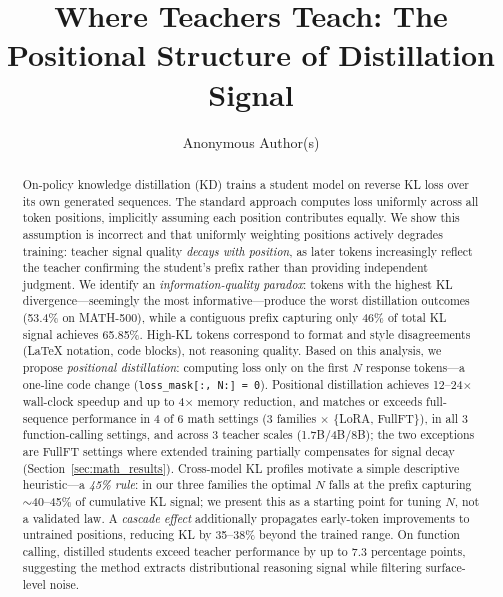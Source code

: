 \documentclass[10pt]{article}
\title{Where Teachers Teach: The Positional Structure of Distillation Signal}
\author{
  Anonymous Author(s)
}
\begin{document}
\maketitle

\begin{abstract}
On-policy knowledge distillation (KD) trains a student model on reverse KL loss over its own generated sequences.
The standard approach computes loss uniformly across all token positions, implicitly assuming each position contributes equally.
We show this assumption is incorrect and that uniformly weighting positions actively degrades training: teacher signal quality \emph{decays with position}, as later tokens increasingly reflect the teacher confirming the student's prefix rather than providing independent judgment.
We identify an \emph{information-quality paradox}: tokens with the highest KL divergence---seemingly the most informative---produce the worst distillation outcomes (53.4\% on MATH-500), while a contiguous prefix capturing only 46\% of total KL signal achieves 65.85\%.
High-KL tokens correspond to format and style disagreements (LaTeX notation, code blocks), not reasoning quality.
Based on this analysis, we propose \emph{positional distillation}: computing loss only on the first $N$ response tokens---a one-line code change (\texttt{loss\_mask[:, N:] = 0}).
Positional distillation achieves 12--24$\times$ wall-clock speedup and up to 4$\times$ memory reduction, and matches or exceeds full-sequence performance in 4 of 6 math settings (3 families $\times$ \{LoRA, FullFT\}), in all 3 function-calling settings, and across 3 teacher scales (1.7B/4B/8B); the two exceptions are FullFT settings where extended training partially compensates for signal decay (Section~\ref{sec:math_results}).
Cross-model KL profiles motivate a simple descriptive heuristic---a \emph{45\% rule}: in our three families the optimal $N$ falls at the prefix capturing $\sim$40--45\% of cumulative KL signal; we present this as a starting point for tuning $N$, not a validated law. A \emph{cascade effect} additionally propagates early-token improvements to untrained positions, reducing KL by 35--38\% beyond the trained range.
On function calling, distilled students exceed teacher performance by up to 7.3 percentage points, suggesting the method extracts distributional reasoning signal while filtering surface-level noise.
\end{abstract}
\end{document}
